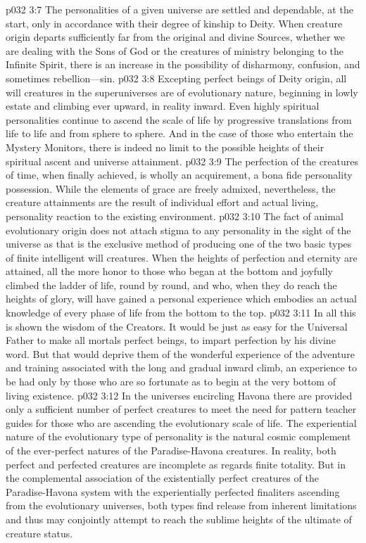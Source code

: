 \pc \vs p032 3:7 The personalities of a given universe are settled and dependable, at the start, only in accordance with their degree of kinship to Deity. When creature origin departs sufficiently far from the original and divine Sources, whether we are dealing with the Sons of God or the creatures of ministry belonging to the Infinite Spirit, there is an increase in the possibility of disharmony, confusion, and sometimes rebellion---sin.
\pc \vs p032 3:8 Excepting perfect beings of Deity origin, all will creatures in the superuniverses are of evolutionary nature, beginning in lowly estate and climbing ever upward, in reality inward. Even highly spiritual personalities continue to ascend the scale of life by progressive translations from life to life and from sphere to sphere. And in the case of those who entertain the Mystery Monitors, there is indeed no limit to the possible heights of their spiritual ascent and universe attainment.
\vs p032 3:9 The perfection of the creatures of time, when finally achieved, is wholly an acquirement, a bona fide personality possession. While the elements of grace are freely admixed, nevertheless, the creature attainments are the result of individual effort and actual living, personality reaction to the existing environment.
\vs p032 3:10 The fact of animal evolutionary origin does not attach stigma to any personality in the sight of the universe as that is the exclusive method of producing one of the two basic types of finite intelligent will creatures. When the heights of perfection and eternity are attained, all the more honor to those who began at the bottom and joyfully climbed the ladder of life, round by round, and who, when they do reach the heights of glory, will have gained a personal experience which embodies an actual knowledge of every phase of life from the bottom to the top.
\vs p032 3:11 In all this is shown the wisdom of the Creators. It would be just as easy for the Universal Father to make all mortals perfect beings, to impart perfection by his divine word. But that would deprive them of the wonderful experience of the adventure and training associated with the long and gradual inward climb, an experience to be had only by those who are so fortunate as to begin at the very bottom of living existence.
\vs p032 3:12 In the universes encircling Havona there are provided only a sufficient number of perfect creatures to meet the need for pattern teacher guides for those who are ascending the evolutionary scale of life. The experiential nature of the evolutionary type of personality is the natural cosmic complement of the ever\hyp{}perfect natures of the Paradise\hyp{}Havona creatures. In reality, both perfect and perfected creatures are incomplete as regards finite totality. But in the complemental association of the existentially perfect creatures of the Paradise\hyp{}Havona system with the experientially perfected finaliters ascending from the evolutionary universes, both types find release from inherent limitations and thus may conjointly attempt to reach the sublime heights of the ultimate of creature status.
